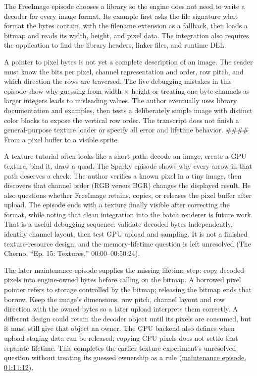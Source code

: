 \hypertarget{06-engine-ii-ch027-loading-image-data-means-interpreting-its-layout}{}

The FreeImage episode chooses a library so the engine does not need to write a decoder for every image format. Its example first asks the file signature what format the bytes contain, with the filename extension as a fallback, then loads a bitmap and reads its width, height, and pixel data. The integration also requires the application to find the library headers, linker files, and runtime DLL.

A pointer to pixel bytes is not yet a complete description of an image. The reader must know the bits per pixel, channel representation and order, row pitch, and which direction the rows are traversed. The live debugging mistakes in this episode show why guessing from width × height or treating one-byte channels as larger integers leads to misleading values. The author eventually uses library documentation and examples, then tests a deliberately simple image with distinct color blocks to expose the vertical row order. The transcript does not finish a general-purpose texture loader or specify all error and lifetime behavior. \#\#\#\# From a pixel buffer to a visible sprite

A texture tutorial often looks like a short path: decode an image, create a GPU texture, bind it, draw a quad. The Sparky episode shows why every arrow in that path deserves a check. The author verifies a known pixel in a tiny image, then discovers that channel order (RGB versus BGR) changes the displayed result. He also questions whether FreeImage retains, copies, or releases the pixel buffer after upload. The episode ends with a texture finally visible after correcting the format, while noting that clean integration into the batch renderer is future work. That is a useful debugging sequence: validate decoded bytes independently, identify channel layout, then test GPU upload and sampling. It is not a finished texture-resource design, and the memory-lifetime question is left unresolved (The Cherno, ``Ep. 15: Textures,'' 00:00--00:50:24).

The later maintenance episode supplies the missing lifetime step: copy decoded pixels into engine-owned bytes before calling  on the bitmap. A borrowed pixel pointer refers to storage controlled by the bitmap; releasing the bitmap ends that borrow. Keep the image's dimensions, row pitch, channel layout and row direction with the owned bytes so a later upload interprets them correctly. A different design could retain the decoder object until its pixels are consumed, but it must still give that object an owner. The GPU backend also defines when upload staging data can be released; copying CPU pixels does not settle that separate lifetime. This completes the earlier texture experiment's unresolved question without treating its guessed ownership as a rule (\href{https://www.youtube.com/watch?v=CKhGMoTNPOo&t=4272}{maintenance episode, 01:11:12}).

